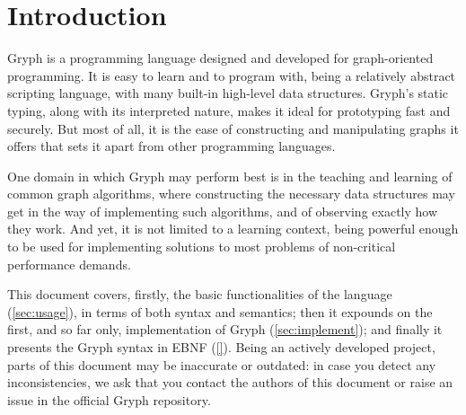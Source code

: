 \section{Introduction}
\label{sec:intro}
Gryph is a programming language designed and developed for graph-oriented programming. It is easy to learn and to program with, being a relatively abstract scripting language, with many built-in high-level data structures. Gryph's static typing, along with its interpreted nature, makes it ideal for prototyping fast and securely. But most of all, it is the ease of constructing and manipulating graphs it offers that sets it apart from other programming languages.

One domain in which Gryph may perform best is in the teaching and learning of common graph algorithms, where constructing the necessary data structures may get in the way of implementing such algorithms, and of observing exactly how they work. And yet, it is not limited to a learning context, being powerful enough to be used for implementing solutions to most problems of non-critical performance demands.

This document covers, firstly, the basic functionalities of the language (\ref{sec:usage}), in terms of both syntax and semantics; then it expounds on the first, and so far only, implementation of Gryph (\ref{sec:implement}); and finally it presents the Gryph syntax in EBNF (\ref{}). Being an actively developed project, parts of this document may be inaccurate or outdated: in case you detect any inconsistencies, we ask that you contact the authors of this document or raise an issue in the official Gryph repository.